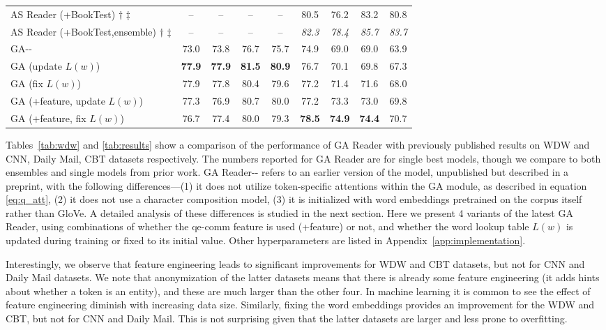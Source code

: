 \documentclass[11pt,a4paper]{article}
\begin{document}
\begin{table*}[ht]
\begin{tabular}{@{}l|cc|cc|cc|cc@{}}
AS Reader (+BookTest) $\dagger$ $\ddagger$ &	--	&	--	&	--	&	--	&	80.5	&	76.2	&	83.2	&	80.8	\\
AS Reader (+BookTest,ensemble) $\dagger$ $\ddagger$ &	--	&	--	&	--	&	--	&	\textit{82.3}	&	\textit{78.4}	&	\textit{85.7}	&	\textit{83.7}	\\ \midrule
GA-{}-   & 73.0   & 73.8    & 76.7     & 75.7    & 74.9     & 69.0  & 69.0      & 63.9         \\
GA (update $L(w)$)	&	\textbf{77.9}	&	\textbf{77.9}	&	\textbf{81.5}	&	\textbf{80.9}	&	76.7	&	70.1	&	69.8	&	67.3	\\
GA (fix $L(w)$)	&	77.9	&	77.8	&	80.4	&	79.6	&	77.2	&	71.4	&	71.6	&	68.0	\\
GA (+feature, update $L(w)$)	&	77.3	&	76.9	&	80.7	&	80.0	&	77.2	&	73.3	&	73.0	&	69.8	\\ 
GA (+feature, fix $L(w)$)	&	76.7	&	77.4	&	80.0	&	79.3	&	\textbf{78.5}	&	\textbf{74.9}	&	\textbf{74.4}	&	70.7	\\ \bottomrule
\end{tabular}
\end{table*}


Tables~\ref{tab:wdw} and \ref{tab:results} show a comparison of the performance of GA Reader with previously published results on WDW and CNN, Daily Mail, CBT datasets respectively. The numbers reported for GA Reader are for single best models, though we compare to both ensembles and single models from prior work. GA Reader-{}- refers to an earlier version of the model, unpublished but described in a preprint,
with the following differences---(1) it does not utilize token-specific attentions within the GA module, as described in equation \eqref{eq:q_att}, (2) it does not use a character composition model, (3) it is initialized with word embeddings pretrained on the corpus itself rather than GloVe. A detailed analysis of these differences is studied in the next section. Here we present 4 variants of the latest GA Reader, using combinations of whether the qe-comm feature is used (+feature) or not, and whether the word lookup table $L(w)$ is updated during training or fixed to its initial value. Other hyperparameters are listed in Appendix~\ref{app:implementation}.

Interestingly, we observe that feature engineering leads to significant improvements for WDW and CBT datasets, but not for CNN and Daily Mail datasets. We note that anonymization of the latter datasets means that there is already some feature engineering (it adds hints about whether a token is an entity), and these are much larger than the other four. In machine learning it is common to see the effect of feature engineering diminish with increasing data size. Similarly, fixing the word embeddings provides an improvement for the WDW and CBT, but not for CNN and Daily Mail. This is not surprising given that the latter datasets are larger and less prone to overfitting.
\end{document}

